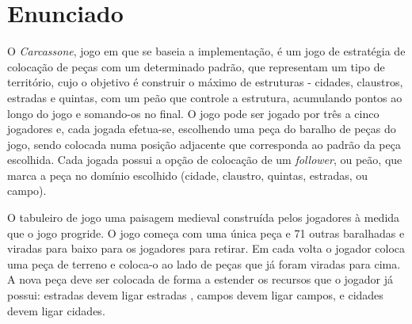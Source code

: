 
\chapter{Enunciado}

O \emph{Carcassone},  jogo em que  se baseia a  implementação, é um jogo  de estratégia de  colocação de
peças com  um determinado padrão,  que representam um  tipo de território, cujo  o objetivo é  construir o
máximo  de estruturas  - cidades,  claustros, estradas  e quintas,  com um  peão que  controle a  estrutura,
acumulando pontos ao longo do  jogo e somando-os no final. O jogo pode ser jogado  por três a cinco jogadores
e, cada  jogada efetua-se, escolhendo uma  peça do baralho de  peças do jogo, sendo  colocada numa posição
adjacente que  corresponda ao padrão da  peça escolhida. Cada jogada  possui a opção de  colocação de um
\emph{follower}, ou peão,  que marca a peça  no domínio escolhido (cidade, claustro,  quintas, estradas, ou
campo).

O tabuleiro de jogo uma paisagem medieval construída pelos jogadores à medida que o jogo progride. O jogo começa com
uma única peça e 71 outras baralhadas e  viradas para baixo para os jogadores para retirar. 
Em cada volta o jogador coloca uma peça de terreno e coloca-o ao lado de peças que já foram viradas para cima.
A nova peça deve ser colocada de forma a estender os recursos que o jogador já possui: 
estradas devem ligar estradas , campos devem ligar campos, e cidades devem ligar cidades.

